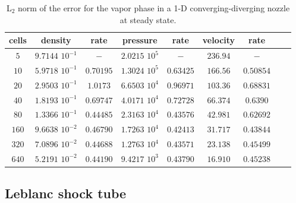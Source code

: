 \begin{table}[H]
\begin{center}
 \caption{\label{tbl:l2_norm_vap} L$_2$ norm of the error for the vapor phase in a 1-D converging-diverging nozzle at steady state.}
 \begin{tabular}{|c|c|c|c|c|c|c|c|c|}
 \hline
cells & density             & rate      & pressure          & rate      & velocity & rate       \\ \hline
$5$   & $9.7144$ $10^{-1}$  & $-$       & $2.0215$ $10^{5}$ & $-$       & $236.94$ & $-$        \\ \hline
$10$  & $5.9718$ $10^{-1}$  & $0.70195$ & $1.3024$ $10^{5}$ & $0.63425$ & $166.56$ & $0.50854$  \\ \hline
$20$  & $2.9503$ $10^{-1}$  & $1.0173$  & $6.6503$ $10^{4}$ & $0.96971$ & $103.36$ & $0.68831$  \\ \hline
$40$  & $1.8193$ $10^{-1}$  & $0.69747$ & $4.0171$ $10^{4}$ & $0.72728$ & $66.374$ & $0.6390$   \\ \hline
$80$  & $1.3366$ $10^{-1}$  & $0.44485$ & $2.3163$ $10^{4}$ & $0.43576$ & $42.981$ & $0.62692$  \\ \hline
$160$ & $9.6638$ $10^{-2}$  & $0.46790$ & $1.7263$ $10^{4}$ & $0.42413$ & $31.717$ & $0.43844$  \\ \hline
$320$ & $7.0896$ $10^{-2}$  & $0.44688$ & $1.2763$ $10^{4}$ & $0.43571$ & $23.138$ & $0.45499$  \\ \hline
$640$ & $5.2191$ $10^{-2}$  & $0.44190$ & $9.4217$ $10^{3}$ & $0.43790$ & $16.910$ & $0.45238$  \\ \hline
\end{tabular}
\end{center}
\nonumber
\end{table}

\subsection{Leblanc shock tube} \label{sec:Leblanc}

